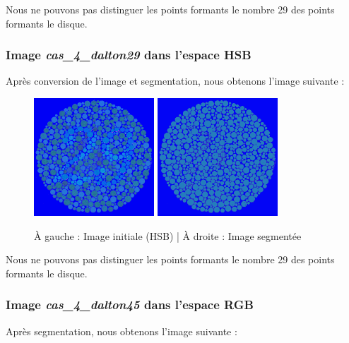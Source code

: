 \documentclass[a4paper]{article}
\begin{document}
Nous ne pouvons pas distinguer les points formants le nombre 29 des points formants le disque.

\subsubsection{Image {\em cas\_4\_dalton29} dans l'espace HSB}

Après conversion de l'image et segmentation, nous obtenons l'image suivante :

\begin{figure}[H]
\begin{center}
\includegraphics[width=170px]{../resultats/cas_4_dalton29_hsb.png}
\includegraphics[width=170px]{../resultats/cas_4_dalton29_hsb_seg.png}
\end{center}
\caption{À gauche : Image initiale (HSB) | À droite : Image segmentée}
\end{figure}

Nous ne pouvons pas distinguer les points formants le nombre 29 des points formants le disque.

\clearpage
\subsubsection{Image {\em cas\_4\_dalton45} dans l'espace RGB}

Après segmentation, nous obtenons l'image suivante :
\end{document}
